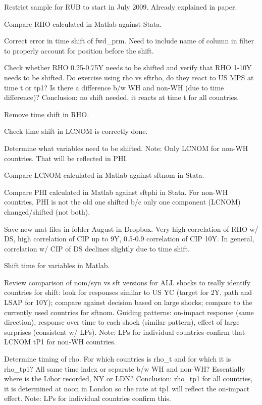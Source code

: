 \documentclass[12pt]{article}
\newcommand{\cmark}{\ding{51}}
\newcommand{\done}{\rlap{$\square$}{\raisebox{2pt}{\large\hspace{1pt}\cmark}}%
	\hspace{-2.5pt}}
\begin{document}
\begin{todolist}
\begin{todolist}
		\item[\done] Restrict sample for RUB to start in July 2009. Already explained in paper.
		\item[\done] Compare RHO calculated in Matlab against Stata.
		\item[\done] Correct error in time shift of fwd_prm. Need to include name of column in filter to properly account for position before the shift.
		\item[\done] Check whether RHO 0.25-0.75Y needs to be shifted and verify that RHO 1-10Y needs to be shifted. Do exercise using rho vs sftrho, do they react to US MPS at time t or tp1? Is there a difference b/w WH and non-WH (due to time difference)? Conclusion: no shift needed, it reacts at time t for all countries.
		\item[\done] Remove time shift in RHO.
		\item[\done] Check time shift in LCNOM is correctly done.
		\item[\done] Determine what variables need to be shifted. Note: Only LCNOM for non-WH countries. That will be reflected in PHI.
		\item[\done] Compare LCNOM calculated in Matlab against sftnom in Stata.
		\item[\done] Compare PHI calculated in Matlab against sftphi in Stata. For non-WH countries, PHI is not the old one shifted b/c only one component (LCNOM) changed/shifted (not both).
		\item[\done] Save new mat files in folder August in Dropbox. Very high correlation of RHO w/ DS, high correlation of CIP up to 9Y, 0.5-0.9 correlation of CIP 10Y. In general, correlation w/ CIP of DS declines slightly due to time shift.
	\end{todolist}
	\item[\done] Shift time for variables in Matlab.
	\begin{todolist}
		\item[\done] Review comparison of nom/syn vs sft versions for ALL shocks to really identify countries for shift: look for responses similar to US YC (target for 2Y, path and LSAP for 10Y); compare against decision based on large shocks; compare to the currently used countries for sftnom. Guiding patterns: on-impact response (same direction), response over time to each shock (similar pattern), effect of large surprises (consistent w/ LPs). Note: LPs for individual countries confirm that LCNOM tP1 for non-WH countries.
		\item[\done] Determine timing of rho. For which countries is rho_t and for which it is rho_tp1? All same time index or separate b/w WH and non-WH? Essentially where is the Libor recorded, NY or LDN? Conclusion: rho_tp1 for all countries, it is determined at noon in London so the rate at tp1 will reflect the on-impact effect. Note: LPs for individual countries confirm this.

\end{todolist}
\end{todolist}
\end{document}
